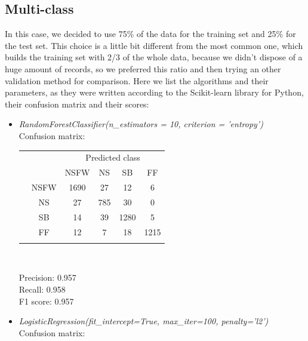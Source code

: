 \subsection{Multi-class}
In this case, we decided to use 75\% of the data for the training set and 25\% for the test set. This choice is a little bit different from the most common one, which builds the training set with 2/3 of the whole data, because we didn't dispose of a huge amount of records, so we preferred this ratio and then trying an other validation method for comparison.
Here we list the algorithms and their parameters, as they were written according to the Scikit-learn library for Python, their confusion matrix and their scores:
\begin{itemize}
	\item[\PencilRight] \textit{RandomForestClassifier(n\_estimators = 10, criterion = 'entropy')}\\
	Confusion matrix:
	
	{
		\centering
		\begin{tabular}{@{}cc|cccc@{}}
			\multicolumn{1}{c}{} &\multicolumn{1}{c}{} &\multicolumn{4}{c}{Predicted class} \\ 
			\multicolumn{1}{c}{} & 
			\multicolumn{1}{c|}{} & 
			\multicolumn{1}{c}{NSFW} & 
			\multicolumn{1}{c}{NS} &
			\multicolumn{1}{c}{SB} & 
			\multicolumn{1}{c}{FF} \\
			\cline{2-6}
			\multirow[c]{4}{*}{\rotatebox[origin=tr]{90}{Actual class}}
			& NSFW  & 1690 & 27 & 12 & 6\\
			& NS  & 27  & 785 & 30 &  0\\
			& SB  & 14  & 39 & 1280 & 5\\
			& FF  & 12 &  7 &  18 & 1215\\
			\cline{2-6}\\
		\end{tabular}\\
	}
	
	Precision: 0.957\\
	Recall: 0.958\\
	F1 score: 0.957

	\item[\PencilRight] \textit{LogisticRegression(fit\_intercept=True, max\_iter=100, penalty='l2')}\\
	Confusion matrix:
	

\end{itemize}
